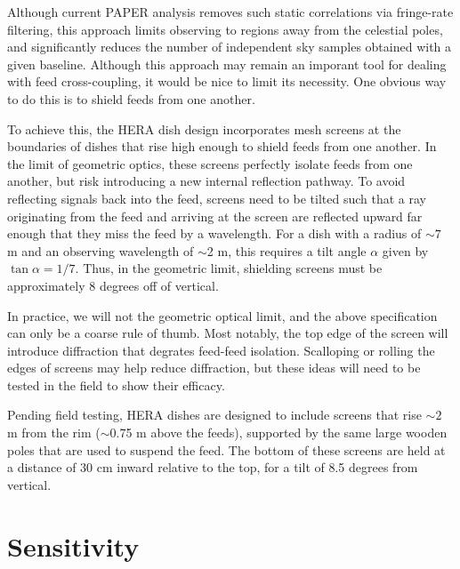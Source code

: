 \documentclass[11pt]{article}
\begin{document}
Although current PAPER analysis removes such static correlations via fringe-rate filtering, this
approach limits observing to regions away from the celestial poles, and significantly reduces the number
of independent sky samples obtained with a given baseline.  Although this approach may remain an
imporant tool for dealing with feed cross-coupling, it would be nice to limit its necessity.
One obvious way to do this is to shield feeds from one another.

To achieve this, the HERA dish design incorporates mesh screens at the boundaries of dishes that rise high
enough to shield feeds from one another.  In the limit of geometric optics, these screens perfectly isolate
feeds from one another, but risk introducing a new internal reflection pathway.  To avoid reflecting signals back into the feed,
screens need to be tilted such that a ray originating from the feed and arriving at the screen are
reflected upward far enough that they miss the feed by a wavelength.
For a dish with a radius of $\sim7$ m and an observing wavelength of $\sim$2 m, this requires a tilt angle $\alpha$
given by $\tan\alpha=1/7$.  Thus, in the geometric limit, shielding screens must be approximately 8 degrees off of vertical.

In practice, we will not the geometric optical limit, and the above specification can only be a coarse rule of thumb.
Most notably, the top edge of the screen will introduce diffraction that degrates feed-feed isolation.  Scalloping
or rolling the edges of screens may help reduce diffraction, but these ideas will need to be tested in the field to
show their efficacy.

Pending field testing, HERA dishes are designed to include screens that rise $\sim2$ m from the rim ($\sim$0.75 m above the 
feeds), supported
by the same large wooden poles that are used to suspend the feed.  The bottom of these screens are held at a distance of
30 cm inward relative to the top, for a tilt of 8.5 degrees from vertical.

\section{Sensitivity}
\end{document}
